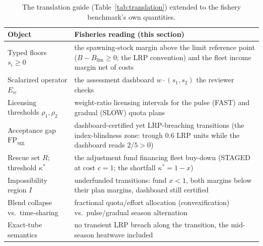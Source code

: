 \documentclass[3p,11pt]{elsarticle}
\begin{document}
\begin{table}[htbp]
\centering
\small
\caption{The translation guide (Table~\ref{tab:translation}) extended to
the fishery benchmark's own quantities.}
\label{tab:fisheries}
\begin{tabular}{@{}p{4.1cm}p{9.4cm}@{}}
\toprule
Object & Fisheries reading (this section) \\
\midrule
Typed floors \(s_i \ge 0\) & the spawning-stock margin above the limit reference point (\(B - B_{\mathrm{lim}} \ge 0\); the LRP convention) and the fleet income margin net of costs \\
Scalarized operator \(E_w\) & the assessment dashboard \(w \cdot (s_1, s_2)\) the reviewer checks \\
Licensing thresholds \(\rho_1, \rho_2\) & weight-ratio licensing intervals for the pulse (FAST) and gradual (SLOW) quota plans \\
Acceptance gap \(\mathrm{FP}_{\mathrm{agg}}\) & dashboard-certified yet LRP-breaching transitions (the index-blindness zone: trough \(0.6\) LRP units while the dashboard reads \(2/5 > 0\)) \\
Rescue set \(R\); threshold \(\kappa^*\) & the adjustment fund financing fleet buy-down (STAGED at cost \(c = 1\); the shortfall \(\kappa^* = 1 - x\)) \\
Impossibility region \(I\) & underfunded transitions: fund \(x < 1\), both margins below their plan margins, dashboard still certified \\
Blend collapse vs.\ time-sharing & fractional quota/effort allocation (convexification) vs.\ pulse/gradual season alternation \\
Exact-tube semantics & no transient LRP breach along the transition, the mid-season heatwave included \\
\bottomrule
\end{tabular}
\end{table}
\end{document}

